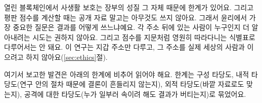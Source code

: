 열린 블록체인에서 사생활 보호는 장부의 성질 그 자체 때문에 한계가 있어요. 그리고 평판 점수를 계산할 때는 공개 자료 말고는 아무것도 쓰지 않아요. 그래서 윤리에서 가장 중요한 질문은 결과를 어떻게 쓰느냐예요. 각 주소 뒤에 있는 사람이 누구인지 더 알아내려는 시도는 권하지 않아요. 그리고 점수를 지문처럼 영원히 따라다니는 식별표로 다루어서는 안 돼요. 이 연구는 지갑 주소만 다루고, 그 주소를 실제 세상의 사람과 이으려고 하지 않아요(\ref{sec:ethics}절).


여기서 보고한 발견은 아래의 한계에 비추어 읽어야 해요. 한계는 구성 타당도, 내적 타당도(연구 안의 절차 때문에 결론이 흔들리지 않는지), 외적 타당도(바깥 자료로도 맞는지), 공격에 대한 타당도(누가 일부러 속이려 해도 결과가 버티는지)로 묶었어요.


